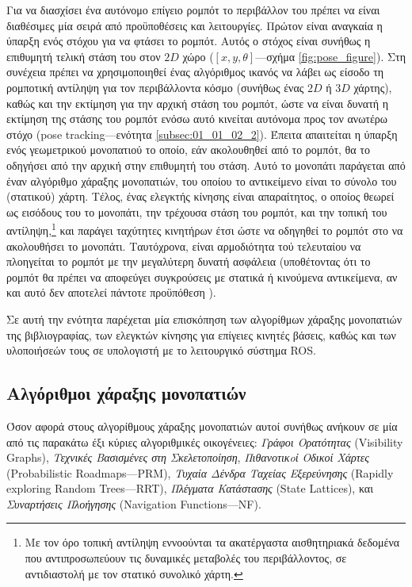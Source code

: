 Για να διασχίσει ένα αυτόνομο επίγειο ρομπότ το περιβάλλον του πρέπει να είναι
διαθέσιμες μία σειρά από προϋποθέσεις και λειτουργίες. Πρώτον είναι αναγκαία η
ύπαρξη ενός στόχου για να φτάσει το ρομπότ. Αυτός ο στόχος είναι συνήθως η
επιθυμητή τελική στάση του στον $2D$ χώρο ($[x, y, \theta]$---σχήμα
\ref{fig:pose_figure}). Στη συνέχεια πρέπει να χρησιμοποιηθεί ένας αλγόριθμος
ικανός να λάβει ως είσοδο τη ρομποτική αντίληψη για τον περιβάλλοντα κόσμο
(συνήθως ένας $2D$ ή $3D$ χάρτης), καθώς και την εκτίμηση για την αρχική στάση
του ρομπότ, ώστε να είναι δυνατή η εκτίμηση της στάσης του ρομπότ ενόσω αυτό
κινείται αυτόνομα προς τον ανωτέρω στόχο (pose tracking---ενότητα
\ref{subsec:01_01_02_2}).  Έπειτα απαιτείται η ύπαρξη ενός γεωμετρικού
μονοπατιού το οποίο, εάν ακολουθηθεί από το ρομπότ, θα το οδηγήσει από την
αρχική στην επιθυμητή του στάση. Αυτό το μονοπάτι παράγεται από έναν αλγόριθμο
χάραξης μονοπατιών, του οποίου το αντικείμενο είναι το σύνολο του (στατικού)
χάρτη. Τέλος, ένας ελεγκτής κίνησης είναι απαραίτητος, ο οποίος θεωρεί ως
εισόδους του το μονοπάτι, την τρέχουσα στάση του ρομπότ, και την τοπική του
αντίληψη,\footnote{Με τον όρο τοπική αντίληψη εννοούνται τα ακατέργαστα
αισθητηριακά δεδομένα που αντιπροσωπεύουν τις δυναμικές μεταβολές του
περιβάλλοντος, σε αντιδιαστολή με τον στατικό συνολικό χάρτη.} και παράγει
ταχύτητες κινητήρων έτσι ώστε να οδηγηθεί το ρομπότ στο να ακολουθήσει το
μονοπάτι. Ταυτόχρονα, είναι αρμοδιότητα τού τελευταίου να πλοηγείται το ρομπότ
με την μεγαλύτερη δυνατή ασφάλεια (υποθέτοντας ότι το ρομπότ θα πρέπει να
αποφεύγει συγκρούσεις με στατικά ή κινούμενα αντικείμενα, αν και αυτό δεν
αποτελεί πάντοτε προϋπόθεση \cite{Gandhi2017}).

Σε αυτή την ενότητα παρέχεται μία επισκόπηση των αλγορίθμων χάραξης μονοπατιών
της βιβλιογραφίας, των ελεγκτών κίνησης για επίγειες κινητές βάσεις, καθώς και
των υλοποιήσεών τους σε υπολογιστή με το λειτουργικό σύστημα ROS.

\subsection{Αλγόριθμοι χάραξης μονοπατιών}
\label{subsection:02_01_02:01}

Όσον αφορά στους αλγορίθμους χάραξης μονοπατιών αυτοί συνήθως ανήκουν σε μία
από τις παρακάτω έξι κύριες αλγοριθμικές οικογένειες: \textit{Γράφοι
Ορατότητας} (Visibility Graphs), \textit{Τεχνικές Βασισμένες στη
Σκελετοποίηση}, \textit{Πιθανοτικoί Οδικοί Χάρτες} (Probabilistic
Roadmaps---PRM), \textit{Τυχαία Δένδρα Ταχείας Εξερεύνησης} (Rapidly exploring
Random Trees---RRT), \textit{Πλέγματα Κατάστασης} (State Lattices), και
\textit{Συναρτήσεις Πλοήγησης} (Navigation Functions---NF).

